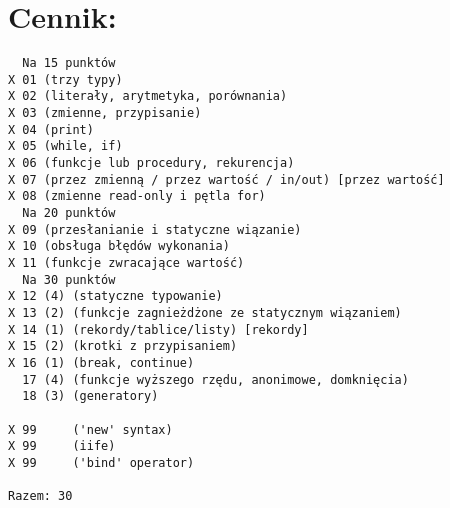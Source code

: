 \documentclass[11pt]{article}
\begin{document}
\clearpage

\section*{Cennik:}
\label{sec:orgbc61c08}
\begin{verbatim}
  Na 15 punktów
X 01 (trzy typy)
X 02 (literały, arytmetyka, porównania)
X 03 (zmienne, przypisanie)
X 04 (print)
X 05 (while, if)
X 06 (funkcje lub procedury, rekurencja)
X 07 (przez zmienną / przez wartość / in/out) [przez wartość]
X 08 (zmienne read-only i pętla for)
  Na 20 punktów
X 09 (przesłanianie i statyczne wiązanie)
X 10 (obsługa błędów wykonania)
X 11 (funkcje zwracające wartość)
  Na 30 punktów
X 12 (4) (statyczne typowanie)
X 13 (2) (funkcje zagnieżdżone ze statycznym wiązaniem)
X 14 (1) (rekordy/tablice/listy) [rekordy]
X 15 (2) (krotki z przypisaniem)
X 16 (1) (break, continue)
  17 (4) (funkcje wyższego rzędu, anonimowe, domknięcia)
  18 (3) (generatory)

X 99     ('new' syntax)
X 99     (iife)
X 99     ('bind' operator)

Razem: 30
\end{verbatim}
\end{document}
